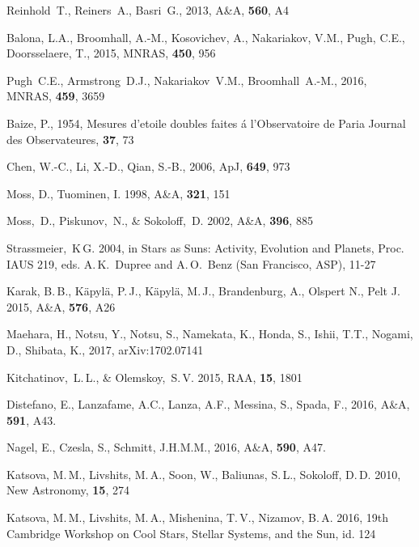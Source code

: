 \documentclass[fleqn,12pt]{SelfArx} %
\begin{document}
\begin{thebibliography}{99}
Reinhold~T., Reiners~A., Basri~G., 2013, A\&A, \textbf{560}, A4

Balona, L.A., Broomhall, A.-M., Kosovichev, A., Nakariakov, V.M., Pugh, C.E., Doorsselaere, T., 2015,  MNRAS, \textbf{450}, 956

Pugh~C.E.,  Armstrong~D.J., Nakariakov~V.M., Broomhall~A.-M., 2016, MNRAS, \textbf{459}, 3659

Baize, P., 1954, Mesures d'etoile doubles faites \'a l'Observatoire de Paria Journal des Observateures, \textbf{37}, 73

Chen, W.-C., Li, X.-D., Qian, S.-B., 2006, ApJ, \textbf{649}, 973


Moss, D., Tuominen, I. 1998, A\&A, \textbf{321}, 151


Moss,~D., Piskunov,~N., \& Sokoloff,~D. 2002, A\&A, \textbf{396}, 885

Strassmeier,~K\,G. 2004, in Stars as Suns: Activity, Evolution and Planets, Proc. IAUS 219, eds. A.\,K.~Dupree and A.\,O.~Benz (San Francisco, ASP), 11-27

Karak, B.\,B., K\"apyl\"a, P.\,J., K\"apyl\"a, M.\,J., Brandenburg, A., Olspert N., Pelt J. 2015, A\&A, \textbf{576}, A26

Maehara, H., Notsu, Y., Notsu, S., Namekata, K., Honda, S., Ishii, T.T., Nogami, D., Shibata, K., 2017,	arXiv:1702.07141

Kitchatinov,~L.\,L., \& Olemskoy,~S.\,V. 2015, RAA, \textbf{15}, 1801

Distefano, E., Lanzafame, A.C., Lanza, A.F., Messina, S., Spada, F., 2016, A\&A, \textbf{591}, A43.

Nagel, E., Czesla, S., Schmitt, J.H.M.M., 2016, A\&A, \textbf{590}, A47.

Katsova, M.\,M., Livshits, M.\,A., Soon, W., Baliunas, S.\,L., Sokoloff, D.\,D. 2010, New Astronomy, \textbf{15}, 274

Katsova, M.\,M., Livshits, M.\,A., Mishenina, T.\,V., Nizamov, B.\,A. 2016, 19th Cambridge Workshop on Cool 
Stars, Stellar Systems, and the Sun, id. 124
  
\end{thebibliography}
\end{document}
